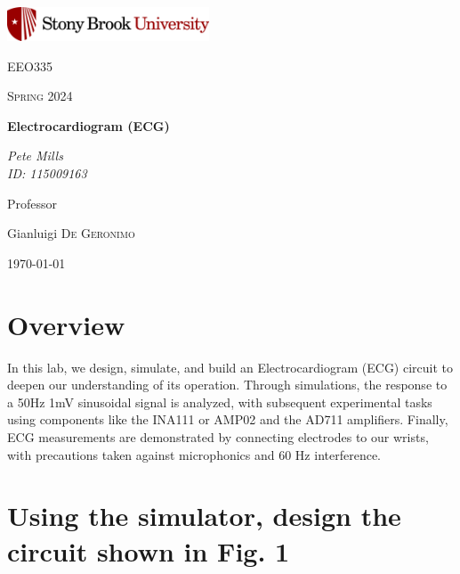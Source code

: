 \documentclass{article}
\begin{document}
	
\begin{titlepage}
	\centering
	\includegraphics[width=0.45\textwidth]{sbu}\par\vspace{1cm}
	{\LARGE \textsc{EEO335}\par}
	\vspace{1cm}
	{\Large \textsc{Spring 2024}\par}
	\vspace{1.5cm}
	{\huge\bfseries Electrocardiogram (ECG)\par}
	\vspace{2cm}
	{\Large\itshape Pete Mills\\ID: 115009163\par}
	\vfill
	Professor\par
	Gianluigi \textsc{De Geronimo}

	\vfill

	{\large \today\par}
\end{titlepage}

	\newcommand{\assName}{Assignment 10r.pdf}

	
	
	

	\section*{Overview}
	
	In this lab, we design, simulate, and build an Electrocardiogram (ECG) circuit to deepen our understanding of its operation. Through simulations, the response to a 50Hz 1mV sinusoidal signal is analyzed, with subsequent experimental tasks using components like the INA111 or AMP02 and the AD711 amplifiers. Finally, ECG measurements are demonstrated by connecting electrodes to our wrists, with precautions taken against microphonics and 60 Hz interference.
	
	\section{Using the simulator, design the circuit shown in Fig. 1}
\end{document}
